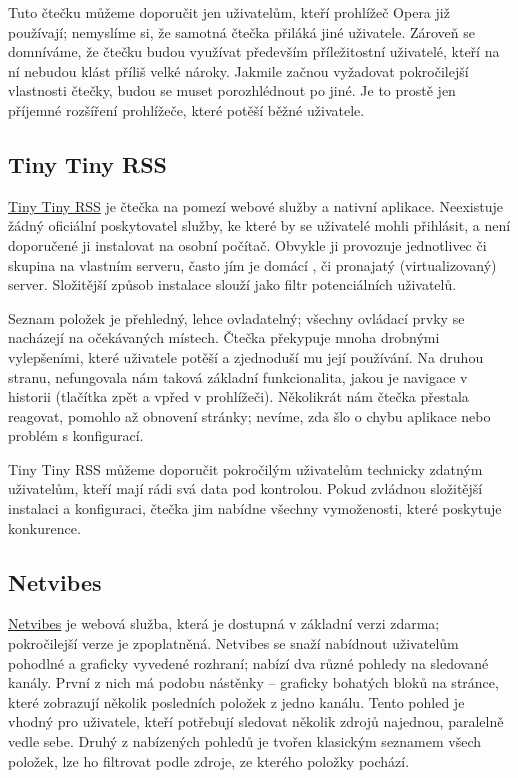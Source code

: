 Tuto čtečku můžeme doporučit jen uživatelům, kteří prohlížeč Opera již používají; nemyslíme si, že samotná čtečka přiláká jiné uživatele.
Zároveň se domníváme, že čtečku budou využívat především příležitostní uživatelé, kteří na ní nebudou klást příliš velké nároky.
Jakmile začnou vyžadovat pokročilejší vlastnosti čtečky, budou se muset porozhlédnout po jiné.
Je to prostě jen příjemné rozšíření prohlížeče, které potěší běžné uživatele.

\subsection{Tiny Tiny RSS}

\href{http://tt-rss.org/}{Tiny Tiny RSS} je čtečka na pomezí webové služby a nativní aplikace.
Neexistuje žádný oficiální poskytovatel služby, ke které by se uživatelé mohli přihlásit, a není doporučené ji instalovat na osobní počítač.
Obvykle ji provozuje jednotlivec či skupina na vlastním serveru, často jím je domácí , či pronajatý (virtualizovaný) server.
Složitější způsob instalace slouží jako filtr potenciálních uživatelů.

Seznam položek je přehledný, lehce ovladatelný; všechny ovládací prvky se nacházejí na očekávaných místech.
Čtečka překypuje mnoha drobnými vylepšeními, které uživatele potěší a zjednoduší mu její používání.
Na druhou stranu, nefungovala nám taková základní funkcionalita, jakou je navigace v historii (tlačítka zpět a vpřed v prohlížeči).
Několikrát nám čtečka přestala reagovat, pomohlo až obnovení stránky; nevíme, zda šlo o chybu aplikace nebo problém s konfigurací.

Tiny Tiny RSS můžeme doporučit pokročilým uživatelům technicky zdatným uživatelům, kteří mají rádi svá data pod kontrolou.
Pokud zvládnou složitější instalaci a konfiguraci, čtečka jim nabídne všechny vymoženosti, které poskytuje konkurence.

\subsection{Netvibes}

\href{http://www.netvibes.com/}{Netvibes} je webová služba, která je dostupná v základní verzi zdarma; pokročilejší verze je zpoplatněná.
Netvibes se snaží nabídnout uživatelům pohodlné a graficky vyvedené rozhraní; nabízí dva různé pohledy na sledované kanály.
První z nich má podobu nástěnky -- graficky bohatých bloků na stránce, které zobrazují několik posledních položek z jedno kanálu.
Tento pohled je vhodný pro uživatele, kteří potřebují sledovat několik zdrojů najednou, paralelně vedle sebe.
Druhý z nabízených pohledů je tvořen klasickým seznamem všech položek, lze ho filtrovat podle zdroje, ze kterého položky pochází.


